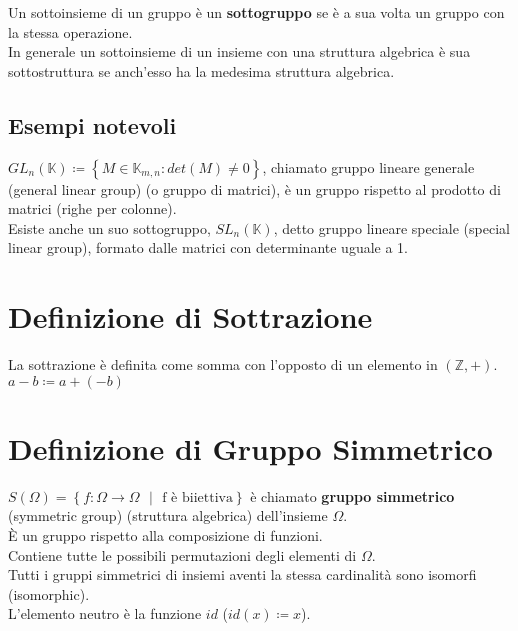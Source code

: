 \documentclass[a4paper, twoside, italian, 11pt]{book}
\newcommand{\braces}[1] {\left \{ #1 \right \}}
\newcommand{\Z}{\mathbb Z}
\newcommand{\K}{\mathbb K}
\begin{document}
Un sottoinsieme di un gruppo è un \textbf{sottogruppo} se è a sua volta un gruppo con la stessa operazione. \\

\noindent
In generale un sottoinsieme di un insieme con una struttura algebrica è sua sottostruttura se anch'esso ha la medesima struttura algebrica.


\subsection{Esempi notevoli}

$GL_n(\K) \coloneqq \braces{M \in \K_{m,n} : det(M) \neq 0}$, chiamato gruppo lineare generale (general linear group) (o gruppo di matrici), è un gruppo rispetto al prodotto di matrici (righe per colonne). \\

\noindent
Esiste anche un suo sottogruppo, $SL_n(\K)$, detto gruppo lineare speciale (special linear group), formato dalle matrici con determinante uguale a 1.



\section{Definizione di Sottrazione}

La sottrazione è definita come somma con l'opposto di un elemento in $(\Z, +)$. \\

$a - b \coloneqq a + (-b)$



\section{Definizione di Gruppo Simmetrico}

$S(\Omega) = \braces{f : \Omega \rightarrow \Omega \text{ $|$ } \text{f è biiettiva}}$ è chiamato \textbf{gruppo simmetrico} (symmetric group) (struttura algebrica) dell'insieme $\Omega$. \\

\noindent
È un gruppo rispetto alla composizione di funzioni. \\
Contiene tutte le possibili permutazioni degli elementi di $\Omega$. \\
Tutti i gruppi simmetrici di insiemi aventi la stessa cardinalità sono isomorfi (isomorphic). \\
L'elemento neutro è la funzione $id$ ($id(x) \coloneqq x$).
\end{document}

